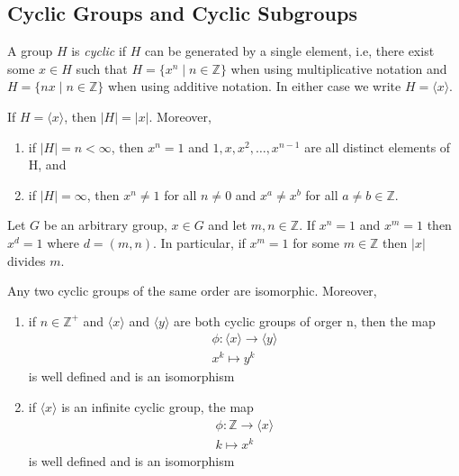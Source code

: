 \documentclass[../main]{subfiles}
\begin{document}
 
 \subsection{Cyclic Groups and Cyclic Subgroups}
 
 
 \begin{dfn}
  A group $H$ is \textit{cyclic} if $H$ can be generated by a single element, i.e, there exist some $x\in H$ such that $H= \{x^n\mid n\in \mathbb{Z}\}$ when using multiplicative notation and $H= \{nx \mid n\in \mathbb{Z}\}$ when using additive notation. In either case we write $H = \langle x \rangle$. 
 \end{dfn}
 
 
 \begin{prop}
  If $H=\langle x\rangle$, then $|H|=|x|$. Moreover,
  \begin{enumerate}
   \item if $|H| = n < \infty $, then $x^n = 1$ and $1,x,x^2,\ldots,x^{n-1}$ are all distinct elements of H, and 
   \item if $|H|= \infty$, then $x^n \neq 1$ for all $n \neq 0$ and $x^a \neq x^b$ for all $a\neq b \in \mathbb{Z}$.
  \end{enumerate}
 \end{prop}
 
 
 \begin{prop}
  Let $G$ be an arbitrary group, $x\in G$ and let $m,n \in \mathbb{Z}$. If $x^n = 1$ and $x^m = 1$ then $x^d = 1$ where $d=(m,n)$. In particular, if $x^m=1$ for some $m\in \mathbb{Z}$ then $|x|$ divides $m$.
 \end{prop}
 
 
 \begin{thm}
  Any two cyclic groups of the same order are isomorphic. Moreover, 
  \begin{enumerate}
   \item if $n\in \mathbb{Z}^+$ and $\langle x \rangle$ and $\langle y \rangle$ are both cyclic groups of orger n, then the map
   \begin{align*}
    \phi \colon \langle x \rangle \to \langle y \rangle \\
    x^k \mapsto y^k
   \end{align*}
   is well defined and is an isomorphism
   \item if $\langle x \rangle$ is an infinite cyclic group, the map 
   \begin{align*}
    \phi \colon \mathbb{Z} \to \langle x \rangle \\
    k \mapsto x^k
   \end{align*}
   is well defined and is an isomorphism
  \end{enumerate}
 \end{thm}
\end{document}
